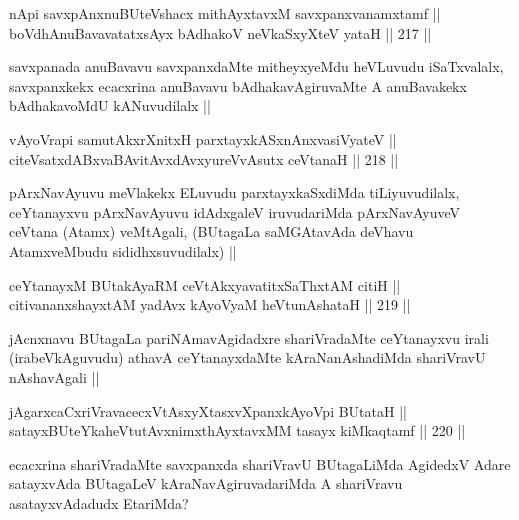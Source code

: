 
\begin{shl}
nApi savxpAnxnuBUteVshacx mithAyxtavxM savxpanxvanamxtamf || \\
boVdhAnuBavavatatxsAyx bAdhakoV neVkaSxyXteV yataH ||  217 ||  
\end{shl}

\begin{artha}
savxpanada anuBavavu savxpanxdaMte mitheyxyeMdu heVLuvudu iSaTxvalalx, savxpanxkekx ecacxrina anuBavavu bAdhakavAgiruvaMte A anuBavakekx bAdhakavoMdU kANuvudilalx ||
\end{artha}

\begin{shl}
vAyoVrapi samutAkxrXnitxH parxtayxkASxnAnxvasiVyateV || \\
citeVsatxdABxvaBAvitAvxdAvxyureVvAsutx ceVtanaH ||  218 ||  
\end{shl}

\begin{artha}
pArxNavAyuvu meVlakekx ELuvudu parxtayxkaSxdiMda tiLiyuvudilalx, ceYtanayxvu pArxNavAyuvu idAdxgaleV iruvudariMda pArxNavAyuveV ceVtana (Atamx) veMtAgali, (BUtagaLa saMGAtavAda deVhavu AtamxveMbudu sididhxsuvudilalx) ||
\end{artha}


\begin{shl}
ceYtanayxM BUtakAyaRM ceVtAkxyavatitxSaThxtAM citiH || \\
citivananxshayxtAM yadAvx kAyoV\s yaM heVtunAshataH ||  219 ||  
\end{shl}

\begin{artha}
jAcnxnavu BUtagaLa pariNAmavAgidadxre shariVradaMte ceYtanayxvu irali (irabeVkAguvudu) athavA ceYtanayxdaMte kAraNanAshadiMda shariVravU nAshavAgali ||
\end{artha}

\begin{shl}
jAgarxcaCxriVravacecxVtAsxyXtasxvXpanxkAyoV\s pi BUtataH ||  \\
satayxBUteYkaheVtutAvxnimxthAyxtavxMM tasayx kiMkaqtamf ||  220 ||  
\end{shl}

\begin{artha}
ecacxrina shariVradaMte savxpanxda shariVravU BUtagaLiMda AgidedxV Adare satayxvAda BUtagaLeV kAraNavAgiruvadariMda A shariVravu asatayxvAdadudx EtariMda?
\end{artha}

